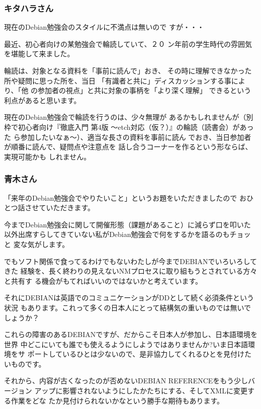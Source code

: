 \documentclass[cjk,dvipdfmx]{beamer}
\begin{document}
\begin{frame}
 
 \frametitle{キタハラさん}

    現在のDebian勉強会のスタイルに不満点は無いので
 すが・・・

    最近、初心者向けの某勉強会で輪読していて、２０
 ン年前の学生時代の雰囲気を堪能して来ました。

    輪読は、対象となる資料を「事前に読んで」おき、
 その時に理解できなかった所や疑問に思った所を、当日
 「有識者と共に」ディスカッションする事により、「他
 の参加者の視点」と共に対象の事柄を「より深く理解」
 できるという利点があると思います。

    現在のDebian勉強会で輪読を行うのは、少々無理が
 あるかもしれませんが（別枠で初心者向け『徹底入門
 第4版 〜etch対応（仮？）』の輪読（読書会）があった
 ら参加したいなぁ〜）、適当な長さの資料を事前に読ん
 でおき、当日参加者が順番に読んで、疑問点や注意点を
 話し合うコーナーを作るという形ならば、実現可能かも
 しれません。
\end{frame}
\begin{frame}
 
 \frametitle{青木さん}

 「来年のDebian勉強会でやりたいこと」というお題をいただきましたので
 おひとつ話させていただきます。

 今までDebian勉強会に関して開催形態（課題があること）に減らず口を叩いた
 以外出席すらしてきていない私がDebian勉強会で何をするかを語るのもチョッと
 変な気がします。

 でもソフト関係で食ってるわけでもないわたしが今までDEBIANでいろいろしてきた
 経験を、長く終わりの見えないNMプロセスに取り組もうとされている方々と共有す
 る機会がもてればいいのではないかと考えています。

 それにDEBIANは英語でのコミュニケーションがDDとして続く必須条件という状況
 もあります。これって多くの日本人にとって結構気の重いものでは無いでしょうか？
\end{frame}

\begin{frame}
 
 これらの障害のあるDEBIANですが、だからこそ日本人が参加し、日本語環境を世界
 中どこにいても誰でも使えるようにしようではありませんか?いま日本語環境をサ
 ポートしているひとは少ないので、是非協力してくれるひとを見付けたいものです。

 それから、内容が古くなったのが否めないDEBIAN REFERENCEをもう少しバージョン
 アップに影響されないようにしたかたちにする、そしてXMLに変更する作業をどな
 たか見付けられないかなという勝手な期待もあります。
\end{frame}
\end{document}

